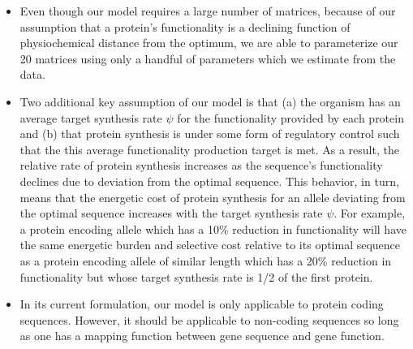 \documentclass{article}
\begin{document}
\begin{itemize}
\item Even though our model requires a large number of matrices, because of our assumption that a protein's functionality is a declining function of physiochemical distance from the optimum, we are able to parameterize our 20 matrices using only a handful of parameters which we estimate from the data.
\item Two additional key assumption of our model is that (a) the organism has an average target synthesis rate $\psi$ for the functionality provided by each protein and (b) that protein synthesis is under some form of  regulatory control such that the this average functionality production target is met.
As a result, the relative rate of protein synthesis increases as the sequence's functionality declines due to deviation from the optimal sequence.
This behavior, in turn, means that the energetic cost of protein synthesis for an allele deviating from the optimal sequence increases with the target synthesis rate $\psi$.
For example, a protein encoding allele which has a 10\% reduction in functionality will have the same energetic burden and selective cost relative to its optimal sequence as a protein encoding allele of similar length which has a 20\% reduction in functionality but whose target synthesis rate is 1/2 of the first protein.
\item In its current formulation, our model is only applicable to protein coding sequences.
However, it should be applicable to non-coding sequences so long as one has a mapping function between gene sequence and gene function.

\end{itemize}



\end{document}
